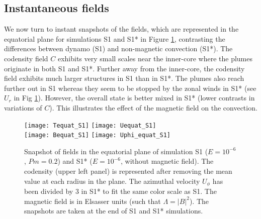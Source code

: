 \documentclass[12pt, a4paper]{article}
\begin{document}
\subsection{Instantaneous fields}	\label{sec:instant}

We now turn to instant snapshots of the fields, which are represented in the equatorial plane for simulations S1 and S1* in Figure \ref{fig:equat_S1}, contrasting the differences between dynamo (S1) and non-magnetic convection (S1*).
The codensity field $C$ exhibits very small scales near the inner-core where the plumes originate in both S1 and S1*.
Further away from the inner-core, the codensity field exhibits much larger structures in S1 than in S1*.
The plumes also reach further out in S1 whereas they seem to be stopped by the zonal winds in S1* (see $U_r$ in Fig \ref{fig:equat_S1}).
However, the overall state is better mixed in S1* (lower contrasts in variations of $C$).
This illustrates the effect of the magnetic field on the convection.


\begin{figure}
\texttt{[image: Tequat\_S1]}
\texttt{[image: Uequat\_S1]} \\[2mm]
\texttt{[image: Bequat\_S1]}
\texttt{[image: Uphi\_equat\_S1]}
\caption{Snapshot of fields in the equatorial plane of simulation S1 ($E=10^{-6}$, $Pm=0.2$) and S1* ($E=10^{-6}$, without magnetic field).
The codensity (upper left panel) is represented after removing the mean value at each radius in the plane.
The azimuthal velocity $U_\phi$ has been divided by 3 in S1* to fit the same color scale as S1.
The magnetic field is in Elsasser units (such that $\Lambda = |B|^2$).
The snapshots are taken at the end of S1 and S1* simulations.
}
\label{fig:equat_S1}
\end{figure}
\end{document}
